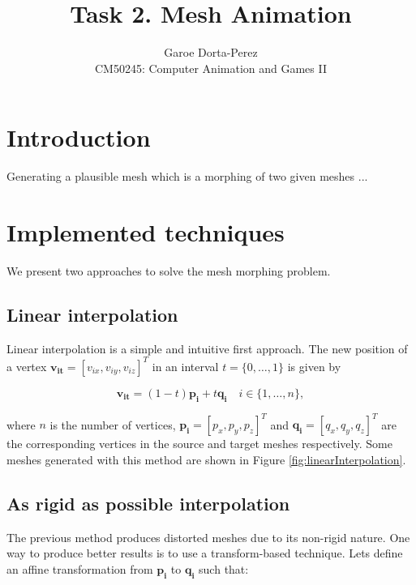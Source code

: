 \documentclass[12pt]{article}
\begin{document}
  
\title{Task 2. Mesh Animation}
\author{Garoe Dorta-Perez\\
CM50245: Computer Animation and Games II}
 
\maketitle
 
\section{Introduction}

Generating a plausible mesh which is a morphing of two given meshes ...

\section{Implemented techniques}

We present two approaches to solve the mesh morphing problem. 

\subsection{Linear interpolation}

Linear interpolation is a simple and intuitive first approach.
The new position of a vertex $\mathbf{v_{it}} = \left[ v_{ix}, v_{iy}, v_{iz}\right]^T $ in an interval $t = \lbrace 0, \ldots, 1 \rbrace$ is given by

\begin{equation*}
\mathbf{v_{it}} = (1 - t) \mathbf{p_i} + t \mathbf{q_i} \quad i \in \lbrace 1, \ldots, n \rbrace,
\end{equation*}

where $n$ is the number of vertices, $\mathbf{p_i} = \left[ p_x, p_y, p_z\right]^T$ and $\mathbf{q_i} = \left[ q_x, q_y, q_z\right]^T$ are the corresponding vertices in the source and target meshes respectively.
Some meshes generated with this method are shown in Figure \ref{fig:linearInterpolation}.

\subsection{As rigid as possible interpolation}

The previous method produces distorted meshes due to its non-rigid nature.
One way to produce better results is to use a transform-based technique.
Lets define an affine transformation from $\mathbf{p_i}$ to $\mathbf{q_i}$ such that:
\end{document}

